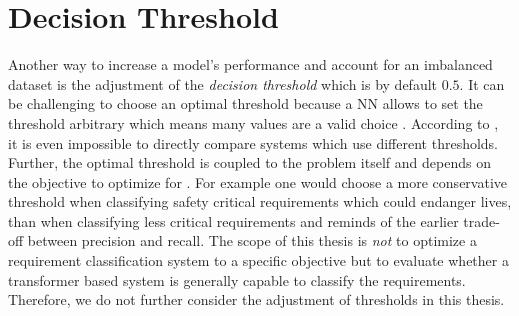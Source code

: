 \section{Decision Threshold}
\label{chp:enhancement_considerations:sec:decision_threshold}
Another way to increase a model's performance and account for an imbalanced dataset is the adjustment of the \textit{decision threshold} which is by default $0.5$.
It can be challenging to choose an optimal threshold because a \ac{NN} allows to set the threshold arbitrary which means many values are a valid choice \parencite{Mazurowski:2008}.
According to \textcite{Mazurowski:2008}, it is even impossible to directly compare systems which use different thresholds.
Further, the optimal threshold is coupled to the problem itself and depends on the objective to optimize for \parencite{Brown:2019}.
For example one would choose a more conservative threshold when classifying safety critical requirements which could endanger lives, than when classifying less critical requirements and reminds of the earlier trade-off between precision and recall.
The scope of this thesis is \textit{not} to optimize a requirement classification system to a specific objective but to evaluate whether a transformer based system is generally capable to classify the requirements.
Therefore, we do not further consider the adjustment of thresholds in this thesis.
